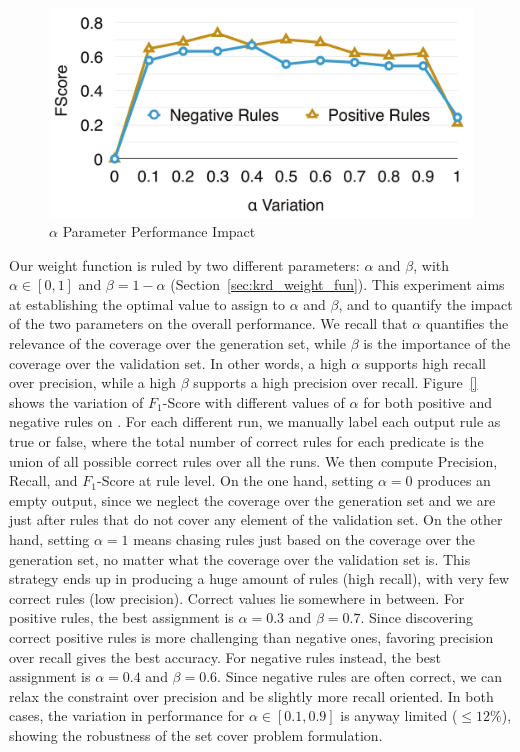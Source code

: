 \begin{figure}[t]
	\centering
	\includegraphics[width=0.9\columnwidth]{include/figure/alpha_impact.pdf}
	\caption{$\alpha$ Parameter Performance Impact}
	\label{fig:alpha_impact}
\end{figure}
Our weight function is ruled by two different parameters: $\alpha$ and $\beta$, with $\alpha \in [0,1]$ and $\beta=1-\alpha$ (Section~\ref{sec:krd_weight_fun}). This experiment aims at establishing the optimal value to assign to $\alpha$ and $\beta$, and to quantify the impact of the two parameters on the overall performance. We recall that $\alpha$ quantifies the relevance of the coverage over the generation set, while $\beta$ is the importance of the coverage over the validation set. In other words, a high $\alpha$ supports high recall over precision, while a high $\beta$ supports a high precision over recall. Figure~\ref{} shows the variation of \textsf{$F_1$-Score} with different values of $\alpha$ for both positive and negative rules on \dbpedia. For each different run, we manually label each output rule as true or false, where the total number of correct rules for each predicate is the union of all possible correct rules over all the runs. We then compute \textsf{Precision}, \textsf{Recall}, and \textsf{$F_1$-Score} at rule level. On the one hand, setting $\alpha=0$ produces an empty output, since we neglect the coverage over the generation set and we are just after rules that do not cover any element of the validation set. On the other hand, setting $\alpha=1$ means chasing rules just based on the coverage over the generation set, no matter what the coverage over the validation set is. This strategy ends up in producing a huge amount of rules (high recall), with very few correct rules (low precision). Correct values lie somewhere in between. For positive rules, the best assignment is $\alpha=0.3$ and $\beta=0.7$. Since discovering correct positive rules is more challenging than negative ones, favoring precision over recall gives the best accuracy. For negative rules instead, the best assignment is $\alpha=0.4$ and $\beta=0.6$. Since negative rules are often correct, we can relax the constraint over precision and be slightly more recall oriented. In both cases, the variation in performance for $\alpha \in [0.1,0.9]$ is anyway limited ($\leq 12\%$), showing the robustness of the set cover problem formulation.

